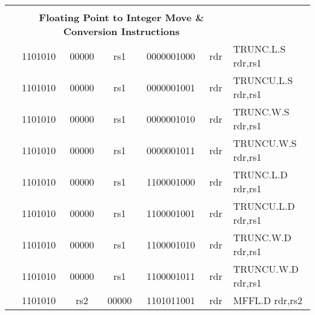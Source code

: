 \begin{table}[p]
\begin{small}
\begin{center}
\begin{tabular}{rcccccccccl}
&
\multicolumn{9}{c}{} & \\
&
\multicolumn{9}{c}{\bf Floating Point to Integer Move \& Conversion Instructions} & \\
\cline{2-10}
  

&
\multicolumn{2}{|c|}{1101010} &
\multicolumn{1}{c|}{00000} &
\multicolumn{1}{c|}{rs1} &
\multicolumn{4}{c|}{0000001000} &
\multicolumn{1}{c|}{rdr} & TRUNC.L.S rdr,rs1 \\
\cline{2-10}
  

&
\multicolumn{2}{|c|}{1101010} &
\multicolumn{1}{c|}{00000} &
\multicolumn{1}{c|}{rs1} &
\multicolumn{4}{c|}{0000001001} &
\multicolumn{1}{c|}{rdr} & TRUNCU.L.S rdr,rs1 \\
\cline{2-10}
  

&
\multicolumn{2}{|c|}{1101010} &
\multicolumn{1}{c|}{00000} &
\multicolumn{1}{c|}{rs1} &
\multicolumn{4}{c|}{0000001010} &
\multicolumn{1}{c|}{rdr} & TRUNC.W.S rdr,rs1 \\
\cline{2-10}
  

&
\multicolumn{2}{|c|}{1101010} &
\multicolumn{1}{c|}{00000} &
\multicolumn{1}{c|}{rs1} &
\multicolumn{4}{c|}{0000001011} &
\multicolumn{1}{c|}{rdr} & TRUNCU.W.S rdr,rs1 \\
\cline{2-10}
  

&
\multicolumn{2}{|c|}{1101010} &
\multicolumn{1}{c|}{00000} &
\multicolumn{1}{c|}{rs1} &
\multicolumn{4}{c|}{1100001000} &
\multicolumn{1}{c|}{rdr} & TRUNC.L.D rdr,rs1 \\
\cline{2-10}
  

&
\multicolumn{2}{|c|}{1101010} &
\multicolumn{1}{c|}{00000} &
\multicolumn{1}{c|}{rs1} &
\multicolumn{4}{c|}{1100001001} &
\multicolumn{1}{c|}{rdr} & TRUNCU.L.D rdr,rs1 \\
\cline{2-10}
  

&
\multicolumn{2}{|c|}{1101010} &
\multicolumn{1}{c|}{00000} &
\multicolumn{1}{c|}{rs1} &
\multicolumn{4}{c|}{1100001010} &
\multicolumn{1}{c|}{rdr} & TRUNC.W.D rdr,rs1 \\
\cline{2-10}
  

&
\multicolumn{2}{|c|}{1101010} &
\multicolumn{1}{c|}{00000} &
\multicolumn{1}{c|}{rs1} &
\multicolumn{4}{c|}{1100001011} &
\multicolumn{1}{c|}{rdr} & TRUNCU.W.D rdr,rs1 \\
\cline{2-10}
  

&
\multicolumn{2}{|c|}{1101010} &
\multicolumn{1}{c|}{rs2} &
\multicolumn{1}{c|}{00000} &
\multicolumn{4}{c|}{1101011001} &
\multicolumn{1}{c|}{rdr} & MFFL.D rdr,rs2 \\
\cline{2-10}
  


\end{tabular}
\end{center}
\end{small}
\end{table}
